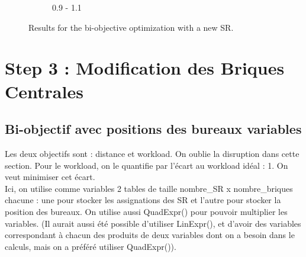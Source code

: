 \documentclass[12pt,a4paper]{article}
\begin{document}
\begin{figure}[H]
\begin{subfigure}{0.32\textwidth}
        \caption{0.9 - 1.1}
        \label{fig:solve3}
    \end{subfigure}
    \caption{Results for the bi-objective optimization with a new SR.}
    \label{fig:all_solves}
\end{figure}

\section*{Step 3 : Modification des Briques Centrales}

\subsection*{Bi-objectif avec positions des bureaux variables}
Les deux objectifs sont : distance et workload. On oublie la disruption dans cette section. Pour le workload, on le quantifie par l'écart au workload idéal : 1. On veut minimiser cet écart.\\
Ici, on utilise comme variables 2 tables de taille nombre\_SR x nombre\_briques chacune : une pour stocker les assignations des SR et l'autre pour stocker la position des bureaux. On utilise aussi QuadExpr() pour pouvoir multiplier les variables. (Il aurait aussi été possible d'utiliser LinExpr(), et d'avoir des variables correspondant à chacun des produits de deux variables dont on a besoin dans le calculs, mais on a préféré utiliser QuadExpr()).
\end{document}
